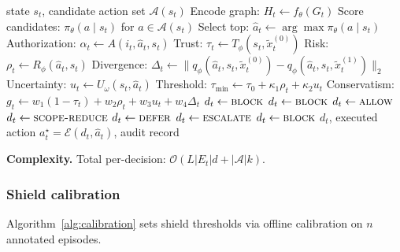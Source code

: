 \documentclass[lettersize,journal]{IEEEtran}
\begin{document}
\begin{algorithm}[t]
\caption{CASTER-ZT bounded autonomous recovery decision}
\label{alg:casterzt}
\begin{algorithmic}[1]
\Require state $s_t$, candidate action set $\mathcal{A}(s_t)$
\State Encode graph: $H_t \gets f_\theta(G_t)$
\State Score candidates: $\pi_\theta(a \mid s_t)$ for $a \in \mathcal{A}(s_t)$
\State Select top: $\hat a_t \gets \arg\max \pi_\theta(a \mid s_t)$
\State Authorization: $\alpha_t \gets A(i_t,\hat a_t,s_t)$
\State Trust: $\tau_t \gets T_\phi(s_t, \tilde{x}_t^{(0)})$
\State Risk: $\rho_t \gets R_\phi(\hat a_t, s_t)$
\State Divergence: $\Delta_t \gets \| q_\phi(\hat a_t,s_t,\tilde{x}_t^{(0)}) - q_\phi(\hat a_t,s_t,\tilde{x}_t^{(1)}) \|_2$
\State Uncertainty: $u_t \gets U_\omega(s_t,\hat a_t)$
\State Threshold: $\tau_{\min} \gets \tau_0 + \kappa_1\rho_t + \kappa_2 u_t$
\State Conservatism: $g_t \gets w_1(1-\tau_t)+w_2\rho_t+w_3 u_t+w_4\Delta_t$
    \State $d_t \gets \textsc{block}$
    \State $d_t \gets \textsc{block}$
    \State $d_t \gets \textsc{allow}$
    \State $d_t \gets \textsc{scope-reduce}$
    \State $d_t \gets \textsc{defer}$
    \State $d_t \gets \textsc{escalate}$
\Else
    \State $d_t \gets \textsc{block}$
\EndIf
\State \Return $d_t$, executed action $a_t^\star = \mathcal{E}(d_t,\hat a_t)$, audit record
\end{algorithmic}
\end{algorithm}

\noindent\textbf{Complexity.}
Total per-decision: $\mathcal{O}(L|E_t|d + |\mathcal{A}|k)$.

\subsubsection{Shield calibration}

Algorithm~\ref{alg:calibration} sets shield thresholds via offline calibration on $n$ annotated episodes.
\end{document}
